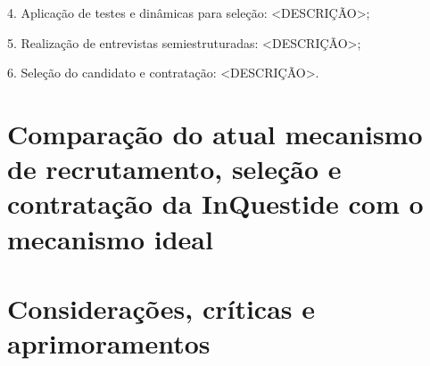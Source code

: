4. Aplicação de testes e dinâmicas para seleção: <DESCRIÇÃO>;

5. Realização de entrevistas semiestruturadas: <DESCRIÇÃO>;

6. Seleção do candidato e contratação: <DESCRIÇÃO>.


\section{Comparação do atual mecanismo de recrutamento, seleção e contratação da InQuestide com o mecanismo ideal}


\section{Considerações, críticas e aprimoramentos}

